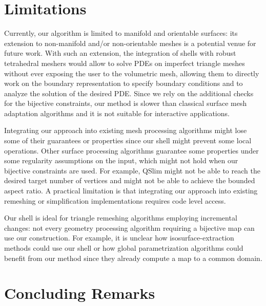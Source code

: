 \section{Limitations}

Currently, our algorithm is limited to manifold and orientable surfaces: its extension to non-manifold and/or non-orientable meshes is a potential venue for future work. With such an extension, the integration of shells with robust tetrahedral meshers  would allow to solve PDEs on imperfect triangle meshes without ever exposing the user to the volumetric mesh, allowing them to directly work on the boundary representation to specify boundary conditions and to analyze the solution of the desired PDE.
%
{Since we rely on the additional checks for the bijective constraints, our method is slower than classical surface mesh adaptation algorithms and it is not suitable for interactive applications.}

{Integrating our approach into existing mesh processing algorithms might lose some of their guarantees or properties since our shell might prevent some local operations.
Other surface processing algorithms guarantee some properties under some regularity assumptions on the input, which might not hold when our bijective constraints are used. 
For example, 
QSlim \cite{garland1997surface} might not be able to reach the desired target number of vertices and \cite{dey2010polygonal} might not be able to achieve the bounded aspect ratio.}
{A practical limitation is that integrating our approach into existing remeshing or simplification implementations requires code level access.}

{Our shell is ideal for triangle remeshing algorithms employing incremental changes: not every geometry processing algorithm requiring a bijective map can use our construction. For example, it is unclear how isosurface-extraction methods \cite{hass2020approximating} could use our shell or how global parametrization algorithms \cite{kraevoy2004cross,Schreiner:2004,alliez2003isotropic,bommes2013quad} could benefit from our method since they already compute a map to a common domain.}


\section{Concluding Remarks}

